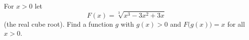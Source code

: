 For $x>0$ let
\[
F(x)=\sqrt[3]{x^3-3x^2+3x}
\]
(the real cube root). Find a function $g$ with $g(x)>0$ and $F\bigl(g(x)\bigr)=x$ for all $x>0$.

